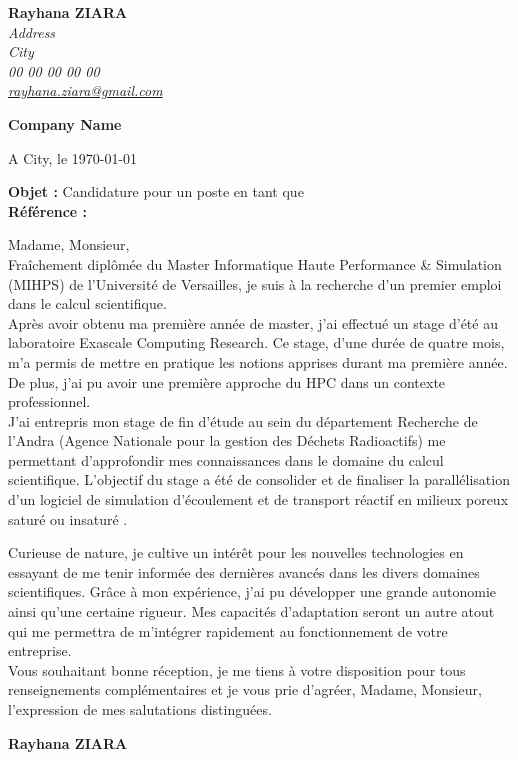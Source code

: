 \documentclass[11pt]{letter}
\begin{document}
\sffamily
\hfill

\begin{flushleft}
{\bfseries Rayhana ZIARA}\\[.35ex]
\small\itshape
Address\\
City\\[.35ex]
00 00 00 00 00\\
\href{mailto:rayhana.ziara@gmail.com}{rayhana.ziara@gmail.com}
\end{flushleft}

\begin{flushright}
{\bfseries Company Name}\\[.35ex]
\small\itshape
\end{flushright}

\hfill

\begin{flushright}
A City, le \today \\  
\end{flushright}

{\bfseries Objet : }Candidature pour un poste en tant que \og  \fg\\ 
{\bfseries Référence : }

Madame, Monsieur,\\

Fraîchement diplômée du Master Informatique Haute Performance \& Simulation (MIHPS) de l'Université de Versailles, je suis à la recherche d'un premier emploi dans le calcul scientifique.\\ 

Après avoir obtenu ma première année de master, j'ai effectué un stage d'été au laboratoire Exascale Computing Research. Ce stage, d'une durée de quatre mois, m'a permis de mettre en pratique les notions apprises durant ma première année. De plus, j'ai pu avoir une première approche du HPC dans un contexte professionnel. \\

J'ai entrepris mon stage de fin d'étude au sein du département Recherche de l'Andra (Agence Nationale pour la gestion des Déchets Radioactifs) me permettant d'approfondir mes connaissances dans le domaine du calcul scientifique. L'objectif du stage a été de consolider et de finaliser la parallélisation  d'un logiciel de \og simulation d'écoulement et de transport réactif en milieux poreux saturé ou insaturé \fg. 

Curieuse de nature, je cultive un intérêt pour les nouvelles technologies en essayant de me tenir informée des dernières avancés dans les divers domaines scientifiques. Grâce à mon expérience, j'ai pu développer une grande autonomie ainsi qu'une certaine rigueur. Mes capacités d'adaptation seront un autre atout qui me permettra de m'intégrer rapidement au fonctionnement de votre entreprise. \\

Vous souhaitant bonne réception, je me tiens à votre disposition pour tous renseignements complémentaires et je vous prie d'agréer, Madame, Monsieur, l'expression de mes salutations distinguées. \\

\begin{flushright}
{\bfseries Rayhana ZIARA}\\
\end{flushright}
\vfill
\end{document}

